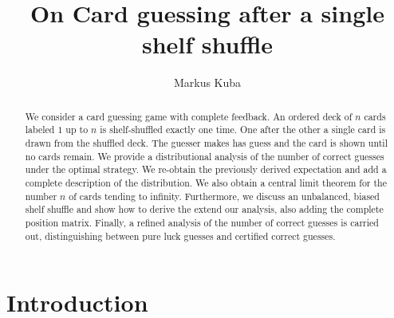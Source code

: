 \documentclass[10pt,reqno,a4paper]{amsart}
\theoremstyle{definition}
\begin{document}
\author[M.~Kuba]{Markus Kuba}
\address{Markus Kuba\\
Department Applied Mathematics and Physics\\
University of Applied Sciences - Technikum Wien\\
H\"ochst\"adtplatz 5, 1200 Wien} %

\title[Card guessing after a single shelf shuffle]{On Card guessing after a single shelf shuffle}

%

\begin{abstract}
We consider a card guessing game with complete feedback. An ordered deck of
$n$ cards labeled $1$ up to $n$ is shelf-shuffled exactly one time. 
One after the other a single card is drawn from the shuffled deck. The guesser makes has guess and the card is shown until no cards remain. We provide a distributional analysis of the number of correct guesses under the optimal strategy. We re-obtain the previously derived expectation and add a complete description of the distribution. We also obtain a central limit theorem 
for the number $n$ of cards tending to infinity. Furthermore, we discuss an unbalanced, biased shelf shuffle and show how to derive the extend our analysis, also adding the complete position matrix. Finally, a refined analysis of the number of correct guesses is carried out, distinguishing between pure luck guesses and certified correct guesses.
\end{abstract}

\maketitle



\section{Introduction}
\end{document}
